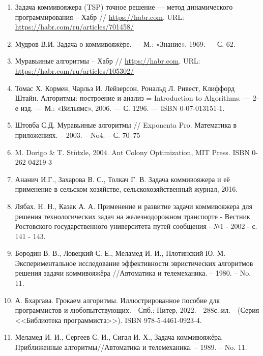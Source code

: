 \begin{enumerate}
    \item \label{bib1} Задача коммивояжера (TSP) точное решение — метод динамического программирования -- Хабр // \url{https://habr.com}. URL: \url{https://habr.com/ru/articles/701458/}
    
    \item \label{bib2} Мудров В.И. Задача о коммивояжёре. — М.: «Знание», 1969. — С. 62. 
    
    \item \label{bib3} Муравьиные алгоритмы -- Хабр // \url{https://habr.com}. URL: \url{https://habr.com/ru/articles/105302/}
    
     \item \label{bib4} Томас Х. Кормен, Чарльз И. Лейзерсон, Рональд Л. Ривест, Клиффорд Штайн. Алгоритмы: построение и анализ = Introduction to Algorithms. — 2-е изд. — М.: «Вильямс», 2006. — С. 1296. — ISBN 0-07-013151-1.
     
    \item \label{bib5} Штовба С.Д. Муравьиные алгоритмы // Exponenta Pro. Математика в приложениях. – 2003. – No4. – С. 70–75

    \item \label{bib6} M. Dorigo \& T. Stützle, 2004. Ant Colony Optimization, MIT Press. ISBN 0-262-04219-3

    \item \label{bib7} Ананич И.Г., Захарова В. С., Толкач Г. В. Задача коммивояжера и её применение в сельском хозяйстве, сельскохозяйственный журнал, 2016.

    \item \label{bib8} Лябах. Н. Н., Казак А. А. Применение и развитие задачи коммивояжера для решения технологических задач на железнодорожном транспорте - Вестник Ростовского государственного университета путей сообщения - №1 - 2002 - с. 141 - 143.

    \item \label{bib9} Бородин В. В., Ловецкий С. Е., Меламед И. И., Плотинский Ю. М. Экспериментальное
    исследование эффективности эвристических алгоритмов решения задачи коммивояжёра //Автоматика и телемеханика. – 1980. – No. 11.

    \item \label{bib10} А. Бхаргава. Грокаем алгоритмы. Иллюстрированное пособие для программистов и любопытствующих. - Спб.: Питер, 2022. - 288с.:ил. - (Серия <<Библиотека программиста>>). ISBN 978-5-4461-0923-4. 

    \item \label{bib11} Меламед И. И., Сергеев С. И., Сигал И. Х., Задача коммивояжёра. Приближенные
    алгоритмы//Автоматика и телемеханика. – 1989. – No. 11.
\end{enumerate}